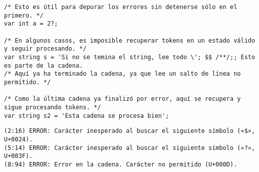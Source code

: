 \begin{enumerate}
\begin{tcolorbox}[title={Código fuente}, colback=white]
\begin{lstlisting}
/* Esto es útil para depurar los errores sin detenerse sólo en el primero. */
var int a = 2?;

/* En algunos casos, es imposible recuperar tokens en un estado válido y seguir procesando. */
var string s = 'Si no se temina el string, lee todo \'; $$ /**/;; Esto es parte de la cadena.
/* Aquí ya ha terminado la cadena, ya que lee un salto de línea no permitido. */

/* Como la última cadena ya finalizó por error, aquí se recupera y sigue procesando tokens. */
var string s2 = 'Esta cadena se procesa bien';
        \end{lstlisting}      
    \end{tcolorbox}

    \begin{tcolorbox}[title={Errores detectados}, colback=white]
        \begin{lstlisting}
(2:16) ERROR: Carácter inesperado al buscar el siguiente símbolo («$», U+0024).
(5:14) ERROR: Carácter inesperado al buscar el siguiente símbolo («?», U+003F).
(8:94) ERROR: Error en la cadena. Carácter no permitido (U+000D).
        \end{lstlisting}
    \end{tcolorbox}

\end{enumerate}